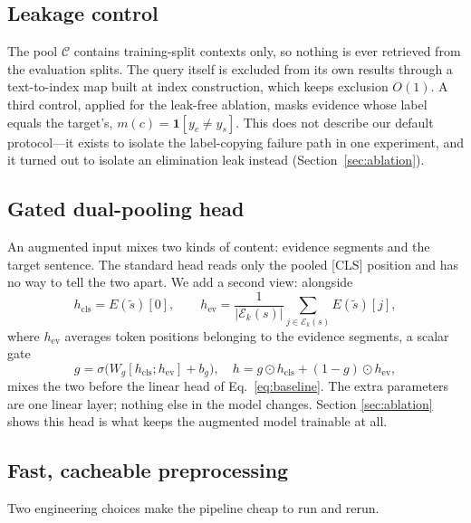 \documentclass[10pt,twocolumn,twoside]{article}
\begin{document}
\subsection{Leakage control}\label{sec:leak}
The pool $\mathcal{C}$ contains training-split contexts only, so nothing is
ever retrieved from the evaluation splits. The query itself is excluded from
its own results through a text-to-index map built at index construction, which
keeps exclusion $O(1)$. A third control, applied for the leak-free ablation,
masks evidence whose label equals the target's, $m(c)=\mathbf{1}[y_c\neq
y_s]$. This does not describe our default protocol---it exists to isolate the
label-copying failure path in one experiment, and it turned out to isolate
an elimination leak instead (Section~\ref{sec:ablation}).

\subsection{Gated dual-pooling head}\label{sec:dual}
An augmented input mixes two kinds of content: evidence segments and the
target sentence. The standard head reads only the pooled
\mbox{[CLS]} position and has no way to tell the two apart. We add a second
view: alongside
\begin{equation}\label{eq:evpool}
h_{\mathrm{cls}}=E(\tilde{s})[0],\qquad
h_{\mathrm{ev}}=\frac{1}{|\mathcal{E}_k(s)|}\sum_{j\in\mathcal{E}_k(s)}
E(\tilde{s})[j],
\end{equation}
where $h_{\mathrm{ev}}$ averages token positions belonging to the evidence
segments, a scalar gate
\begin{equation}\label{eq:gate}
g=\sigma\big(W_g[h_{\mathrm{cls}};h_{\mathrm{ev}}]+b_g\big),\quad
h=g\odot h_{\mathrm{cls}}+(1-g)\odot h_{\mathrm{ev}},
\end{equation}
mixes the two before the linear head of Eq.~\eqref{eq:baseline}. The extra
parameters are one linear layer; nothing else in the model changes. Section
\ref{sec:ablation} shows this head is what keeps the augmented model
trainable at all.

\subsection{Fast, cacheable preprocessing}\label{sec:eff}
Two engineering choices make the pipeline cheap to run and rerun.
\end{document}

